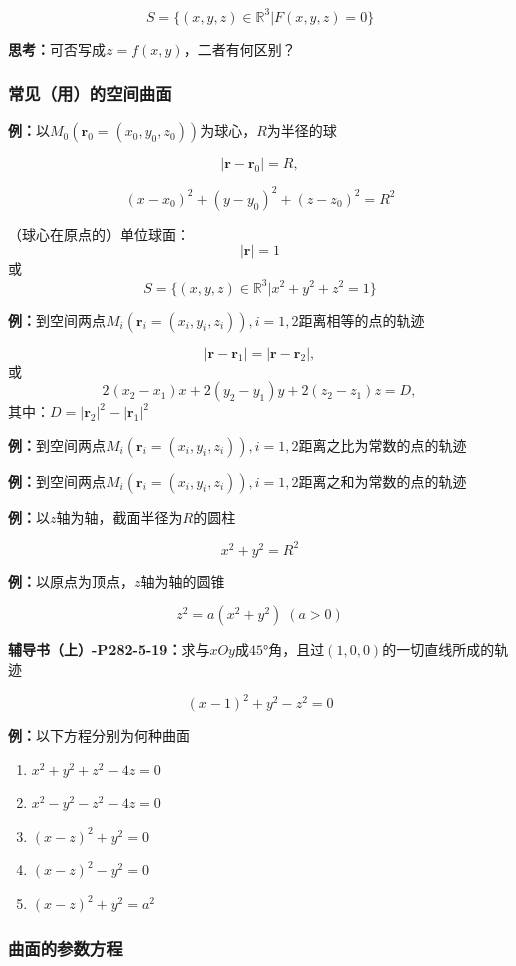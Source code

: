 $$S=\{(x,y,z)\in\mathbb{R}^3|F(x,y,z)=0\}$$

{\bf 思考：}可否写成$z=f(x,y)$，二者有何区别？

\subsubsection{常见（用）的空间曲面}

{\bf 例：}以$M_0(\bm{r}_0=(x_0,y_0,z_0))$为球心，$R$为半径的球

$${|\bm{r}-\bm{r}_0|=R,}$$ 

$${(x-x_0)^2+(y-y_0)^2+(z-z_0)^2=R^2}$$ 

{（球心在原点的）单位球面：}
$$|\bm{r}|=1$$
或
$$S=\{(x,y,z)\in\mathbb{R}^3|x^2+y^2+z^2=1\}$$

{\bf 例：}到空间两点$M_i(\bm{r}_i=(x_i,y_i,z_i)),i=1,2$距离相等的点的轨迹

$${|\bm{r}-\bm{r}_1|=|\bm{r}-\bm{r}_2|},$$
或
$${2(x_2-x_1)x+2(y_2-y_1)y+2(z_2-z_1)z=D,}$$
其中：$D=|\bm{r}_2|^2-|\bm{r}_1|^2$

{\bf 例：}到空间两点$M_i(\bm{r}_i=(x_i,y_i,z_i)),i=1,2$距离之比为常数的点的轨迹

{\bf 例：}到空间两点$M_i(\bm{r}_i=(x_i,y_i,z_i)),i=1,2$距离之和为常数的点的轨迹

{\bf 例：}以$z$轴为轴，截面半径为$R$的圆柱

$$x^2+y^2=R^2$$

{\bf 例：}以原点为顶点，$z$轴为轴的圆锥

$$z^2=a(x^2+y^2)\;(a>0)$$

{\bf 辅导书（上）-P282-5-19：}求与$xOy$成$45$°角，且过$(1,0,0)$的一切直线所成的轨迹

$$(x-1)^2+y^2-z^2=0$$

{\bf 例：}以下方程分别为何种曲面
\begin{enumerate}[(1)]
  \setlength{\itemindent}{1cm}
  \item $x^2+y^2+z^2-4z=0$  
  \item $x^2-y^2-z^2-4z=0$  
  \item $(x-z)^2+y^2=0$  
  \item $(x-z)^2-y^2=0$  
  \item $(x-z)^2+y^2=a^2$ 
\end{enumerate}

\subsubsection{曲面的参数方程}

